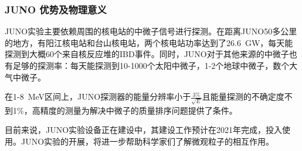 \documentclass[10pt,a4paper]{article}
\begin{document}
\subsubsection{JUNO 优势及物理意义}\label{sub:logicinter}

JUNO实验主要依赖周围的核电站的中微子信号进行探测。在距离JUNO50多公里的地方，有阳江核电站和台山核电站，两个核电站功率达到了\SI{26.6}{GW}，每天能探测到大概60个来自核反应堆的IBD事件。同时，JUNO对于其他来源的中微子也有足够的探测率：每天能探测到10-1000个太阳中微子，1-2个地球中微子，数个大气中微子。

在1-\SI{8 }{MeV}区间上，JUNO探测器的能量分辨率小于$\frac{3\%}{\sqrt{E}}$且能量探测的不确定度不到1\%，高精度的测量为解决中微子的质量排序问题提供了条件。

目前来说，JUNO实验设备正在建设中，其建设工作预计在2021年完成，投入使用。JUNO实验的开展，将进一步帮助科学家们了解微观粒子的相互作用。
\end{document}
